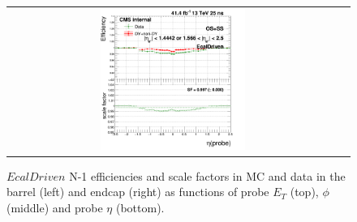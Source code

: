 \begin{figure}[bh]
\begin{center}
\begin{tabular}{cc}
      \includegraphics[width=0.45\textwidth]{figures/Zprime/2017/ScaleFactor/SameSign/N-1/g_compare_cut_eta_Barrel+Endcap_ea_ta_inc_AS_N_1_EcalDriven_PUW.png}
    \end{tabular}
    \caption{$EcalDriven$ N-1 efficiencies and scale factors in MC and data in the barrel (left) and endcap (right) as functions of probe $E_T$ (top), $\phi$ (middle) and probe $\eta$ (bottom).}
    \label{fig:EcalDriven_2017}
  \end{center}
\end{figure}

